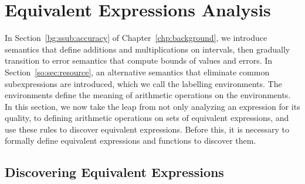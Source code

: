 \section{Equivalent Expressions Analysis}
\label{so:sec:equivalent}

In Section~\ref{bg:ssub:accuracy} of Chapter~\ref{chp:background}, we introduce
semantics that define additions and multiplications on intervals, then
gradually transition to error semantics that compute bounds of values and
errors.  In Section~\ref{so:sec:resource}, an alternative semantics that
eliminate common subexpressions are introduced, which we call the labelling
environments.  The environments define the meaning of arithmetic operations
on the environments.  In this section, we now take the leap from not only
analyzing an expression for its quality, to defining arithmetic operations on
sets of equivalent expressions, and use these rules to discover equivalent
expressions.  Before this, it is necessary to formally define equivalent
expressions and functions to discover them.

\subsection{Discovering Equivalent Expressions}

